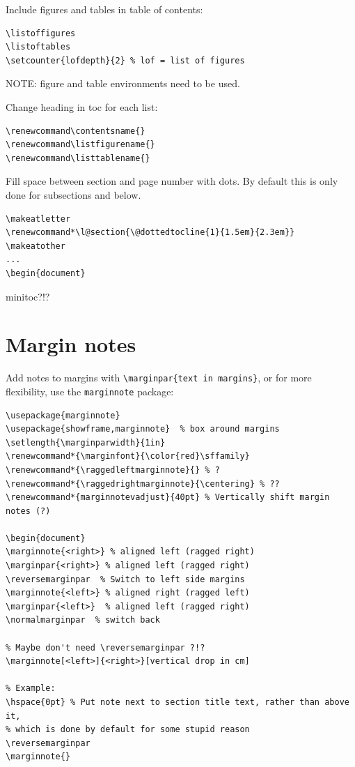 \documentclass{article}
\makeatletter
\renewcommand*\l@section{\@dottedtocline{1}{1.5em}{2.3em}}
\makeatother
\begin{document}
Include figures and tables in table of contents:
\begin{lstlisting}
\listoffigures
\listoftables
\setcounter{lofdepth}{2} % lof = list of figures
\end{lstlisting}
NOTE: figure and table environments need to be used.

Change heading in toc for each list:
\begin{lstlisting}
\renewcommand\contentsname{}
\renewcommand\listfigurename{}
\renewcommand\listtablename{}
\end{lstlisting}

Fill space between section and page number with dots.
By default this is only done for subsections and below.
\begin{lstlisting}
\makeatletter
\renewcommand*\l@section{\@dottedtocline{1}{1.5em}{2.3em}}
\makeatother
...
\begin{document}
\end{lstlisting}

minitoc?!?

\clearpage
\section{Margin notes}
Add notes to margins with \verb|\marginpar{text in margins}|,
or for more flexibility, use the \verb|marginnote| package:
\begin{lstlisting}
\usepackage{marginnote}
\usepackage{showframe,marginnote}  % box around margins
\setlength{\marginparwidth}{1in}
\renewcommand*{\marginfont}{\color{red}\sffamily}
\renewcommand*{\raggedleftmarginnote}{} % ?
\renewcommand*{\raggedrightmarginnote}{\centering} % ??
\renewcommand*{marginnotevadjust}{40pt} % Vertically shift margin notes (?)

\begin{document}
\marginnote{<right>} % aligned left (ragged right)
\marginpar{<right>} % aligned left (ragged right)
\reversemarginpar  % Switch to left side margins
\marginnote{<left>} % aligned right (ragged left)
\marginpar{<left>}  % aligned left (ragged right)
\normalmarginpar  % switch back

% Maybe don't need \reversemarginpar ?!?
\marginnote[<left>]{<right>}[vertical drop in cm]

% Example:
\hspace{0pt} % Put note next to section title text, rather than above it,
% which is done by default for some stupid reason
\reversemarginpar
\marginnote{}
\end{lstlisting}
\end{document}
